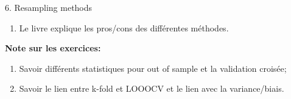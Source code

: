 \documentclass[12pt, titlepage, french]{report}
\begin{document}
\begin{CHPT_SUMM}[label = {VALID-RESAMPLING}]{6. Resampling methods}
\begin{enumerate}
\begin{enumerate}
\begin{enumerate}
			\item	\textbf{k-fold Cross Validation}: Partitionne les données en k sous-ensembles et en prends la moyenne.
		\end{enumerate}
	\end{enumerate}
	\item	Le livre explique les pros/cons des différentes méthodes.
\end{enumerate}
\textbf{Note sur les exercices:} 
\begin{enumerate}
	\item	Savoir différents statistiques pour out of sample et la validation croisée;
	\item	Savoir le lien entre k-fold et LOOOCV et le lien avec la variance/biais.
\end{enumerate}
\end{CHPT_SUMM}
\end{document}
